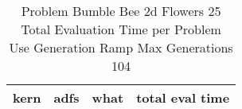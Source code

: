 \begin{table}[H]
\caption{Problem  Bumble Bee 2d  Flowers 25\\Total Evaluation Time per Problem \\ Use Generation Ramp  Max Generations 104\\}
\begin{center}
\scalebox{1.0} %
{
\begin{tabular}{lllr}
\hline
kern & adfs & what & total eval time \\
\hline


\end{tabular}
}
\end{center}
\end{table}

